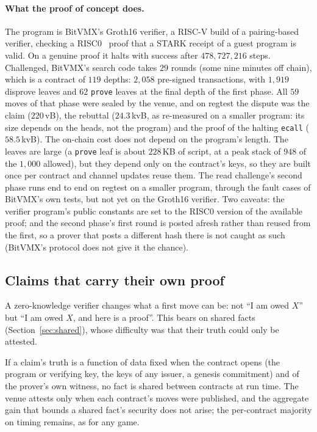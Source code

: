 \documentclass[11pt]{article}
\begin{document}
\paragraph{What the proof of concept does.} The program is BitVMX's
Groth16 verifier, a RISC-V build of a pairing-based verifier, checking
a RISC0~\cite{risc0} proof that a STARK receipt of a guest program is
valid. On a genuine proof it halts with success after
$478{,}727{,}216$ steps. Challenged, BitVMX's search code takes $29$
rounds (some nine minutes off chain), which is a contract of $119$
depths: $2{,}058$ pre-signed transactions, with $1{,}919$ disprove
leaves and $62$ \texttt{prove} leaves at the final depth of the first
phase. All $59$ moves of that phase were sealed by the venue, and on
regtest the dispute was the claim ($220$\,vB), the rebuttal
($24.3$\,kvB, as re-measured on a smaller program: its size depends
on the heads, not the program) and the proof of the halting \texttt{ecall}
($58.5$\,kvB). The on-chain cost does not depend on the program's
length. The leaves are large (a \texttt{prove} leaf is about $228$\,KB
of script, at a peak stack of $948$ of the $1{,}000$ allowed), but they
depend only on the contract's keys, so they are built once per contract
and channel updates reuse them. The read challenge's second phase runs
end to end on regtest on a smaller program, through the fault cases of
BitVMX's own tests, but not yet on the Groth16 verifier. Two caveats:
the verifier program's public constants are set to the RISC0 version of
the available proof; and the second phase's first round is posted
afresh rather than reused from the first, so a prover that posts a
different hash there is not caught as such (BitVMX's protocol does not
give it the chance).

\subsection{Claims that carry their own proof}
\label{sec:zkclaims}

A zero-knowledge verifier changes what a first move can be: not ``I
am owed $X$'' but ``I am owed $X$, and here is a proof''. This bears on
shared facts (Section~\ref{sec:shared}), whose difficulty was that
their truth could only be attested.

If a claim's truth is a function of data fixed when the contract opens
(the program or verifying key, the keys of any issuer, a genesis
commitment) and of the prover's own witness, no fact is shared between
contracts at run time. The venue attests only when each contract's
moves were published, and the aggregate gain that bounds a shared
fact's security does not arise; the per-contract majority on timing
remains, as for any game.
\end{document}
